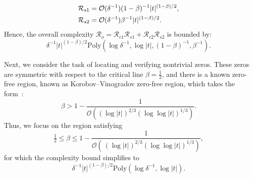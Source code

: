 \documentclass[aps,pra,twocolumn,superscriptaddress,preprintnumbers,amsmath,amssymb]{revtex4-2}
\begin{document}
\begin{align}
    \mathcal{R}_{s1}&=\mathcal{O}(\delta^{-1})(1-\beta)^{-1}|t|^{(1-\beta)/2},\notag\\
    \mathcal{R}_{s2}&=\mathcal{O}(\delta^{-1})\beta^{-1}|t|^{(1-\beta)/2}.
\end{align}
Hence, the overall complexity
$\mathcal{R}_{o}=\mathcal{R}_{c1}\mathcal{R}_{s1}+\mathcal{R}_{c2}\mathcal{R}_{s2}$ is bounded by:
\begin{equation}
    \delta^{-1}|t|^{(1-\beta)/2}
    \mathrm{Poly}(\log\delta^{-1},\log|t|,(1-\beta)^{-1},\beta^{-1}).
\end{equation}
\par

Next, we consider the task of locating and verifying nontrivial zeros. These zeros are symmetric with respect to the critical line $\beta = \tfrac{1}{2}$, and there is a known zero-free region, known as Korobov--Vinogradov zero-free region, which takes the form~\cite{mossinghoff2024explicit}:
\begin{equation}
    \beta > 1 - \frac{1}{ \mathcal{O}((\log |t|)^{2/3} (\log \log |t|)^{1/3})}.
\end{equation}
 Thus, we focus on the region satisfying
\begin{equation}\label{eq:region}
    \tfrac{1}{2}\leq \beta \leq 1-\frac{1}{\mathcal{O} (\, (\log |t|)^{2/3} (\log \log |t|)^{1/3})},
\end{equation}
for which the complexity bound simplifies to
\begin{equation}
    \delta^{-1}|t|^{(1-\beta)/2}
    \mathrm{Poly}(\log\delta^{-1},\log|t|).
\end{equation}








\end{document}
